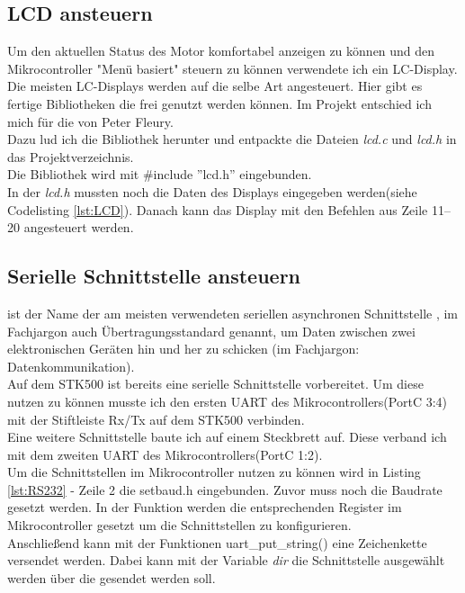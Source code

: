 \lstset{language=C, basicstyle=\footnotesize, showstringspaces=false, tabsize=8}


\subsection{LCD ansteuern}
\label{sec:LCD}
Um den aktuellen Status des Motor komfortabel anzeigen zu können und den Mikrocontroller "Menü basiert" steuern zu können verwendete ich ein LC-Display.\\
Die meisten LC-Displays werden auf die selbe Art angesteuert. Hier gibt es fertige Bibliotheken die frei genutzt werden können. Im Projekt entschied ich mich für die von Peter Fleury\cite{uC:Fleury}.\\
Dazu lud ich die Bibliothek herunter und entpackte die Dateien \emph{lcd.c} und \emph{lcd.h} in das Projektverzeichnis. \\
Die Bibliothek wird mit \#include ''lcd.h'' eingebunden.\\
In der \emph{lcd.h} mussten noch die Daten des Displays eingegeben werden(siehe Codelisting \ref{lst:LCD}).
Danach kann das Display mit den Befehlen aus Zeile 11--20 angesteuert werden.

\lstset{language=C, basicstyle=\footnotesize, showstringspaces=false, tabsize=8}


\subsection{Serielle Schnittstelle ansteuern}
\label{sec:RS232}	
 ist der Name der am meisten verwendeten seriellen asynchronen Schnittstelle , im Fachjargon auch Übertragungsstandard genannt, um Daten zwischen zwei elektronischen Geräten hin und her zu schicken (im Fachjargon: Datenkommunikation).\cite{uC:rs232}\\
Auf dem STK500 ist bereits eine serielle Schnittstelle vorbereitet. Um diese nutzen zu können musste ich den ersten UART des Mikrocontrollers(PortC 3:4) mit der Stiftleiste Rx/Tx auf dem STK500 verbinden.\\
Eine weitere Schnittstelle baute ich auf einem Steckbrett auf. Diese verband ich mit dem zweiten UART des Mikrocontrollers(PortC 1:2).\\
Um die Schnittstellen im Mikrocontroller nutzen zu können wird in Listing \ref{lst:RS232} - Zeile 2 die setbaud.h eingebunden. Zuvor muss noch die Baudrate gesetzt werden.
In der Funktion  werden die entsprechenden Register im Mikrocontroller gesetzt um die Schnittstellen zu konfigurieren.\\
Anschließend kann mit der Funktionen uart\_put\_string() eine Zeichenkette versendet werden. Dabei kann mit der Variable \emph{dir} die Schnittstelle ausgewählt werden über die gesendet werden soll.
\lstset{language=C, basicstyle=\footnotesize, showstringspaces=false, tabsize=8}


